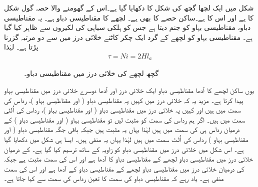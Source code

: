 شکل   میں ایک لچھا گچھ کی شکل کا دکھایا گیا ہے۔اس کے گھومنے والا حصہ گول شکل کا ہے اور اس کا  ہے۔ساکن حصے کا بھی  ہے۔ لچھے کا مقناطیسی دباو  ہے۔  یہ مقناطیسی دباو، مقناطیسی بہاو   کو جنم دیتا ہے جس کو ہلکی سیاہی کی  لکیروں سے ظاہر کیا گیا ہے۔ مقناطیسی بہاو کو لچھے کے گرد ایک چکر کاٹتے خلائی درز میں سے دو مرتبہ گزرنا پڑتا ہے۔ لہٰذا
\begin{align}
\tau=N i=2 H l_a
\end{align}
%
\begin{figure}
\centering
\caption{گچھ لچھے کی خلائی درز میں مقناطیسی دباو۔}
\label{شکل_گھومتے_مشین_گچھ_لچھے_کا_دباو}
\end{figure}

یوں ساکن لچھے کا آدھا مقناطیسی دباو ایک خلائی درز اور آدھا دوسرے خلائی درز میں مقناطیسی بہاو پیدا کرتا ہے۔ مزید یہ کہ خلائی درز میں کہیں پہ مقناطیسی دباو ( اور  مقناطیسی بہاو )،  رداس کی سمت میں ہیں اور کہیں  پہ خلائی درز میں مقناطیسی دباو ( اور مقناطیسی بہاو )، رداس کی اُلٹی سمت میں ہیں۔ اگر ہم رداس کی سمت کو مثبت لیں تو   مقناطیسی بہاو ( اور مقناطیسی دباو )  کے درمیان رداس ہی کی  سمت میں ہیں لہٰذا یہاں  یہ مثبت ہیں جبکہ باقی جگہ  مقناطیسی دباو ( اور مقناطیسی بہاو ) رداس کی اُلٹ سمت میں ہیں لہٰذا یہاں یہ منفی ہیں۔ ایسا ہی شکل   میں دکھایا گیا ہے۔ اس شکل میں خلائی درز میں مقناطیسی دباو کو زاویہ کے ساتھ ترسیم کیا گیا ہے۔ کے درمیان خلائی درز میں مقناطیسی دباو  لچھے کے مقناطیسی دباو  کا آدھا ہے اور اس کی سمت مثبت ہے جبکہ  کی درمیان خلائی درز میں مقناطیسی دباو لچھے کے مقناطیسی دباو کے آدھا ہے اور اس کی سمت منفی ہے۔ یاد رہے کہ مقناطیسی دباو کی سمت کا تعین رداس کی سمت سے کیا جاتا ہے۔

